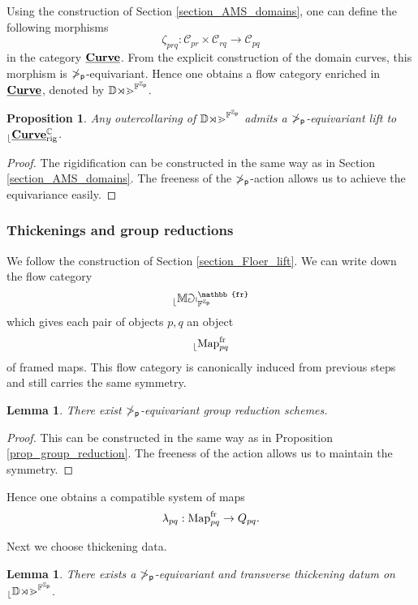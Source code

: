 \documentclass[reqno, 10pt]{amsart}
\numberwithin{equation}{section}
\numberwithin{equation}{section}
\newtheorem{prop}[thm]{Proposition}
\newtheorem{lemma}[thm]{Lemma}
\theoremstyle{definition}
\theoremstyle{remark}
\newcommand{\beqn}{\begin{equation*}}
\newcommand{\eeqn}{\end{equation*}}
\newcommand{\mb}{\mathbb}
\newcommand{\mc}{\mathcal}
\newcommand{\p}{{\sf p}}
\newcommand{\zp}{{{\mb Z}_{\sf p}}}
\renewcommand{\outer}{{}_{\lfloor}}
\newcommand{\uds}[1]{\underline{\smash{#1}}}
\begin{document}
Using the construction of Section \ref{section_AMS_domains}, one can define the following morphisms
\beqn
\zeta_{prq}: {\mc C}_{pr} \times {\mc C}_{rq} \to {\mc C}_{pq}
\eeqn
in the category $\uds{\bf Curve}$. From the explicit construction of the domain curves, this morphism is $\mb\Pi_\p$-equivariant. Hence one obtains a flow category enriched in $\uds{\bf Curve}$, denoted by $\mb{Dom}^{\mb{F}^\zp}$.


 

\begin{prop}\label{prop245}
Any outercollaring of $\mb{Dom}^{\mb{F}^{\zp}}$ admits a $\mb\Pi_\p$-equivariant lift to $\outer \uds{\bf Curve}_{\rm rig}^{\mb C}$.
\end{prop}

\begin{proof}
The rigidification can be constructed in the same way as in Section \ref{section_AMS_domains}. The freeness of the $\mb\Pi_\p$-action allows us to achieve the equivariance easily. 
\end{proof}


\subsubsection{Thickenings and group reductions}

We follow the construction of Section \ref{section_Floer_lift}. We can write down the flow category 
\beqn
\outer \mb{Map}_{\mb{F}^{\zp}}^{\mb{fr}}
\eeqn
which gives each pair of objects $p, q$ an object 
\beqn
\outer {\rm Map}_{pq}^{\rm fr}
\eeqn
of framed maps. This flow category is canonically induced from previous steps and still carries the same symmetry. 

\begin{lemma}
There exist $\mb\Pi_\p$-equivariant group reduction schemes.
\end{lemma}

\begin{proof}
This can be constructed in the same way as in Proposition \ref{prop_group_reduction}. The freeness of the action allows us to maintain the symmetry. 
\end{proof}

Hence one obtains a compatible system of maps
\beqn
\lambda_{pq}: {\rm Map}_{pq}^{\rm fr} \to Q_{pq}.
\eeqn

Next we choose thickening data. 

\begin{lemma}
There exists a $\mb\Pi_\p$-equivariant and transverse thickening datum on $\outer \mb{Dom}^{\mb{F}^{\zp}}$.
\end{lemma}
\end{document}
